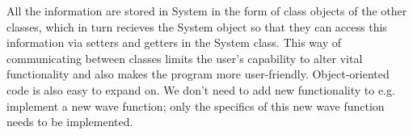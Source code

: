 \documentclass[english, a4paper]{article}
\begin{document}
\noindent All the information are stored in System in the form of class objects of the other classes, which in turn 
recieves the System object so that they can access this information via
setters and getters in the System class. This way of communicating between classes limits the user's 
capability to alter vital functionality and also makes the program more user-friendly. 
Object-oriented code is also easy to expand on. We don't need to add new functionality to
e.g. implement a new wave function; only the specifics of this new wave function needs to be implemented. 

\begin{comment}
\section{Results}

We calculate the ground-state energies for the magic numbers $N = 2$, $N=6$, $N=12$ and $N=20$
and for oscillator frequencies
$\omega = 0.01$, $\omega = 0.05$, $\omega = 0.1$, $\omega = 0.5$ and $\omega = 1.0$. 
The one-body density is computed for all $N$ and $\omega$, both with and without the Jastrow factor. 
For $N=2$ we calculate the ground state energy using two different wave functions:
\begin{enumerate}
 \item The trial wave function is \eqref{TrialWF2} for which we have an analytic
 expression \eqref{analyticLocalEnergy} for the Laplacian $\nabla \Psi_T$ (method 1)
 \item The trial wave function is \eqref{TrialWF}, i.e. the full Slater determinant (method 2)
\end{enumerate}
These two approaches should yield the same energies and is therefore a good test to see
if the Slater determinants are implemented correctly. They are in the following called method 1 and method 2
respectively. We also calculate the mean distance between the two electrons. \\

\noindent
We utilize the blocking technique for error analysis of the enegrgy calculations. A performance analysis
is made by comparing the time usage of a serial vs. a parallel version of the code, both with and without
vectorization. 

\subsection{Results for two electrons - method 1}
As a first validation of our code, we calculate the ground state energy of the two-electron system
in a pure harmonic oscillator \eqref{HarmonicOscillator} and benchmark the results with Table \eqref{tab:HOEnergies}.
\end{comment}
\end{document}
